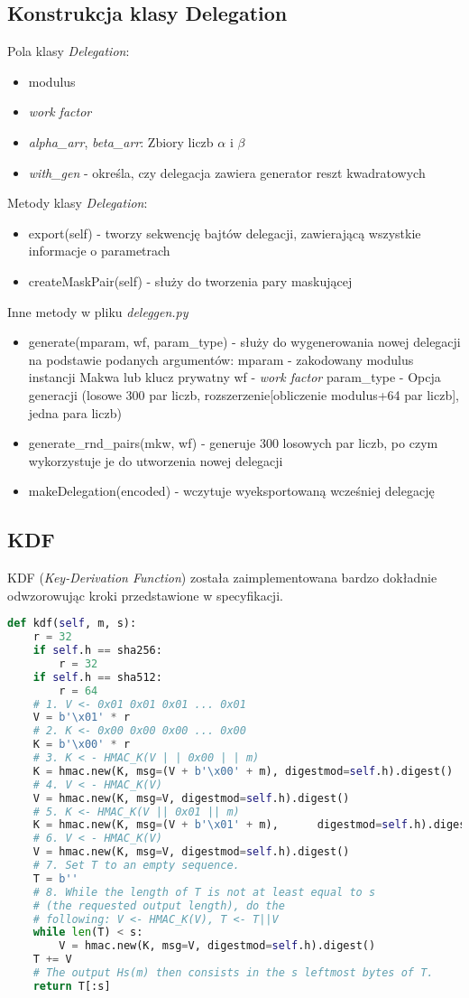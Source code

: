 \documentclass[a4paper,titleauthor]{mwart}
\begin{document}
\subsection{Konstrukcja klasy Delegation}
Pola klasy \textit{Delegation}:
\begin{itemize}
	\item modulus
	\item \textit{work factor}
	\item \textit{alpha\_arr}, \textit{beta\_arr}: Zbiory liczb $\alpha$ i $\beta$
	\item \textit{with\_gen} - określa, czy delegacja zawiera generator reszt kwadratowych
\end{itemize}
Metody klasy \textit{Delegation}:
\begin{itemize}
	\item export(self) - tworzy sekwencję bajtów delegacji, zawierającą wszystkie informacje o parametrach
	\item createMaskPair(self) - służy do tworzenia pary maskującej
\end{itemize}
Inne metody w pliku \textit{deleggen.py}
\begin{itemize}
	\item generate(mparam, wf, param\_type) - służy do wygenerowania nowej delegacji na podstawie podanych argumentów:
	\subitem mparam - zakodowany modulus instancji Makwa lub klucz prywatny
	\subitem wf - \textit{work factor}
	\subitem param\_type - Opcja generacji (losowe 300 par liczb, rozszerzenie[obliczenie modulus+64 par liczb], jedna para liczb)
	\item generate\_rnd\_pairs(mkw, wf) - generuje 300 losowych par liczb, po czym wykorzystuje je do utworzenia nowej delegacji
	\item makeDelegation(encoded) - wczytuje wyeksportowaną wcześniej delegację
\end{itemize}
\subsection{KDF}
KDF (\textit{Key-Derivation Function}) została zaimplementowana bardzo dokładnie odwzorowując kroki przedstawione w specyfikacji.
\begin{lstlisting}[language=Python]
def kdf(self, m, s):
	r = 32
	if self.h == sha256:
		r = 32
	if self.h == sha512:
		r = 64
	# 1. V <- 0x01 0x01 0x01 ... 0x01
	V = b'\x01' * r
	# 2. K <- 0x00 0x00 0x00 ... 0x00
	K = b'\x00' * r
	# 3. K < - HMAC_K(V | | 0x00 | | m)
	K = hmac.new(K, msg=(V + b'\x00' + m), digestmod=self.h).digest()
	# 4. V < - HMAC_K(V)
	V = hmac.new(K, msg=V, digestmod=self.h).digest()
	# 5. K <- HMAC_K(V || 0x01 || m)
	K = hmac.new(K, msg=(V + b'\x01' + m), 		digestmod=self.h).digest()
	# 6. V < - HMAC_K(V)
	V = hmac.new(K, msg=V, digestmod=self.h).digest()
	# 7. Set T to an empty sequence.
	T = b''
	# 8. While the length of T is not at least equal to s
	# (the requested output length), do the
	# following: V <- HMAC_K(V), T <- T||V
	while len(T) < s:
		V = hmac.new(K, msg=V, digestmod=self.h).digest()
	T += V
	# The output Hs(m) then consists in the s leftmost bytes of T.
	return T[:s]
\end{lstlisting}
\end{document}
